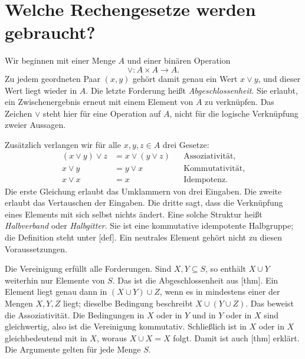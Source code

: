 \par{}
\section*{Welche Rechengesetze werden gebraucht?}
\hypertarget{semilattice.reading.laws}{}

Wir beginnen mit einer Menge \(A\) und einer binären Operation
\[
  \vee\colon A\times A\longrightarrow A.
\]
Zu jedem geordneten Paar \((x,y)\) gehört damit genau ein Wert
\(x\vee y\), und dieser Wert liegt wieder in \(A\).
Die letzte Forderung heißt \emph{Abgeschlossenheit}. Sie erlaubt,
ein Zwischenergebnis erneut mit einem Element von \(A\) zu
verknüpfen. Das Zeichen \(\vee\) steht hier für eine Operation
auf \(A\), nicht für die logische Verknüpfung zweier Aussagen.

Zusätzlich verlangen wir für alle \(x,y,z\in A\) drei Gesetze:
\[
  \begin{aligned}
    (x\vee y)\vee z&=x\vee(y\vee z)
      &&\text{Assoziativität},\\
    x\vee y&=y\vee x
      &&\text{Kommutativität},\\
    x\vee x&=x
      &&\text{Idempotenz}.
  \end{aligned}
\]
Die erste Gleichung erlaubt das Umklammern von drei Eingaben.
Die zweite erlaubt das Vertauschen der Eingaben. Die dritte sagt,
dass die Verknüpfung eines Elements mit sich selbst nichts ändert.
Eine solche Struktur heißt \emph{Halbverband} oder
\emph{Halbgitter}. Sie ist eine kommutative idempotente Halbgruppe;
die Definition steht unter [def].
Ein neutrales Element gehört nicht zu diesen Voraussetzungen.

Die Vereinigung erfüllt alle Forderungen. Sind \(X,Y\subseteq S\),
so enthält \(X\cup Y\) weiterhin nur Elemente von \(S\).
Das ist die Abgeschlossenheit aus
[thm]. Ein Element liegt
genau dann in \((X\cup Y)\cup Z\), wenn es in mindestens
einer der Mengen \(X,Y,Z\) liegt; dieselbe Bedingung beschreibt
\(X\cup(Y\cup Z)\). Das beweist die Assoziativität.
Die Bedingungen \glqq in \(X\) oder in \(Y\)\grqq{} und
\glqq in \(Y\) oder in \(X\)\grqq{} sind gleichwertig,
also ist die Vereinigung kommutativ. Schließlich ist
\glqq in \(X\) oder in \(X\)\grqq{} gleichbedeutend mit
\glqq in \(X\)\grqq{}, woraus \(X\cup X=X\) folgt.
Damit ist auch [thm]
erklärt. Die Argumente gelten für jede Menge \(S\).

